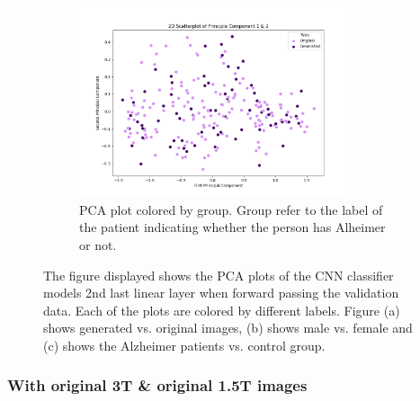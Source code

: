 \documentclass[12pt, fleqn, titlepage]{article}
\newcommand{\1}[1]{\mathds{1}\left[#1\right]}
\begin{document}
\begin{figure}[H]
\begin{subfigure}[t]{0.5\textwidth}
		\centering
		\includegraphics[height=2.2in]{imgs/classifier/with_generated_imgs_pca_group}%
		\caption{PCA plot colored by group. Group refer to the label of the patient indicating whether the person has Alheimer or not.}
	\end{subfigure}

	\caption{The figure displayed shows the PCA plots of the CNN classifier models 2nd last linear layer when forward passing the validation data. Each of the plots are colored by different labels. Figure (a) shows generated vs. original images, (b) shows male vs. female and (c) shows the Alzheimer patients vs. control group. }
		\label{fig:pca_gen}
\end{figure}


\subsubsection{With original 3T \& original 1.5T images }
\end{document}
